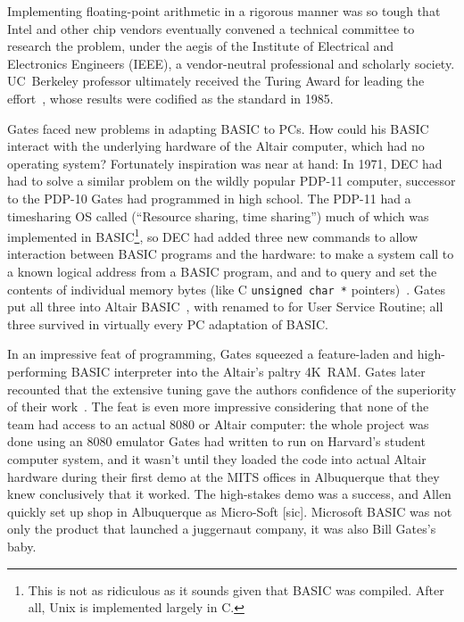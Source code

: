   \begin{tangent}
  Implementing
  floating-point arithmetic in a rigorous manner was so tough that Intel 
  and other chip vendors eventually convened a technical committee to
  research the problem, under the aegis of the Institute of Electrical and 
  Electronics Engineers (IEEE), a vendor-neutral professional and scholarly
  society. 
  UC~Berkeley professor 
  ultimately received the 
  Turing Award for
  leading the effort~\cite{kahan_interview}, whose results were codified as
  the  standard in 1985.
  \end{tangent}

Gates faced new problems in adapting BASIC to PCs.
How could his BASIC interact with the underlying hardware of 
the Altair computer, which had no operating
system?
Fortunately inspiration was near at hand:
In 1971, DEC had had to solve a similar problem 
on the wildly popular PDP-11 computer, successor to the PDP-10 Gates had
programmed in high school.
The PDP-11 had a 
timesharing OS called  (``Resource sharing, time
sharing'') much of which was implemented in BASIC\footnote{This is not as
  ridiculous as it sounds given that BASIC was compiled.  After all,
   Unix is implemented largely in C.}, so DEC had added
three new commands to allow interaction between BASIC programs and the
hardware:  to make a system call to a
known logical address from a BASIC program, and
 and  to query and set the contents of individual memory
bytes (like C \texttt{unsigned char~*}
pointers)~\cite[pp.~204--205]{ceruzzi}.
Gates put all three into Altair BASIC~\cite{smithsonian_interview},
with  renamed to  for User Service Routine; all three
survived in virtually every PC adaptation of BASIC.

In an impressive feat of programming, Gates squeezed a 
feature-laden and high-performing BASIC interpreter into the Altair's
paltry 4K~RAM.
Gates later recounted that the extensive tuning gave the authors
confidence of the superiority of their work~\cite{programmers_at_work}.
The feat is even more impressive considering that none of the team had
access to an actual 8080 or Altair computer: the whole project was done
using an 8080 emulator Gates had written to run on Harvard's student
computer system, and it wasn't until they loaded the code into actual
Altair hardware during their first demo at the MITS offices  in Albuquerque
that they knew conclusively that it worked.
The high-stakes demo was a success, and Allen quickly set up shop in
Albuquerque as Micro-Soft [sic].
Microsoft BASIC was not only the product that launched a juggernaut
company, it was also Bill Gates's baby.

